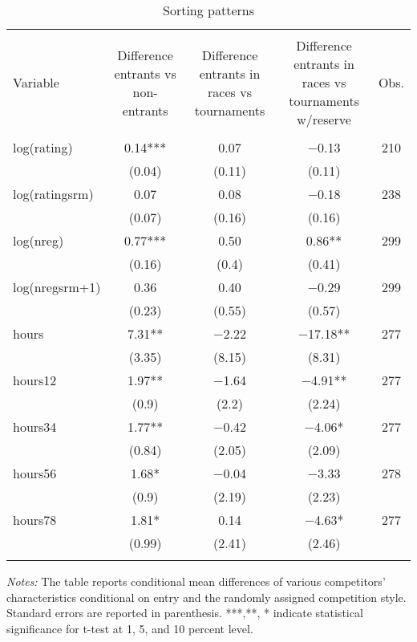 \documentclass[10pt, titlepage]{article}
\begin{document}
\begin{table}
\centering
\caption{Sorting patterns}
\label{sorting table}
\begin{tabular}{@{}lcccc}
  \\[-1.8ex]\hline\hline\\[-1.8ex]
Variable & \multicolumn{1}{L{2cm}}{Difference entrants vs non-entrants} & \multicolumn{1}{L{2cm}}{Difference entrants in races vs tournaments} & \multicolumn{1}{L{2cm}}{Difference entrants in races vs tournaments w/reserve} & Obs. \\ 
  \hline\\[-1.86ex]
log(rating) &  0.14*** &  0.07 &  $-$0.13 & 210 \\ 
   & (0.04) & (0.11) & (0.11) &  \\ 
  log(ratingsrm) &  0.07 &  0.08 &  $-$0.18 & 238 \\ 
   & (0.07) & (0.16) & (0.16) &  \\ 
  log(nreg) &  0.77*** &  0.50 &   0.86** & 299 \\ 
   & (0.16) & (0.4) & (0.41) &  \\ 
  log(nregsrm+1) &  0.36 &  0.40 &  $-$0.29 & 299 \\ 
   & (0.23) & (0.55) & (0.57) &  \\ 
  hours &  7.31** & $-$2.22 & $-$17.18** & 277 \\ 
   & (3.35) & (8.15) & (8.31) &  \\ 
  hours12 &  1.97** & $-$1.64 &  $-$4.91** & 277 \\ 
   & (0.9) & (2.2) & (2.24) &  \\ 
  hours34 &  1.77** & $-$0.42 &  $-$4.06* & 277 \\ 
   & (0.84) & (2.05) & (2.09) &  \\ 
  hours56 &  1.68* & $-$0.04 &  $-$3.33 & 278 \\ 
   & (0.9) & (2.19) & (2.23) &  \\ 
  hours78 &  1.81* &  0.14 &  $-$4.63* & 277 \\ 
   & (0.99) & (2.41) & (2.46) &  \\ 
   \hline\\[-1.8ex]
\end{tabular}
\begin{minipage}{\textwidth}
\footnotesize\emph{Notes:}{ The table reports conditional mean differences of various competitors' characteristics conditional on entry and the randomly assigned competition style. Standard errors are reported in parenthesis. ***,**, * indicate statistical significance for t-test at 1, 5, and 10 percent level.
}\end{minipage}
\end{table}
\end{document}
